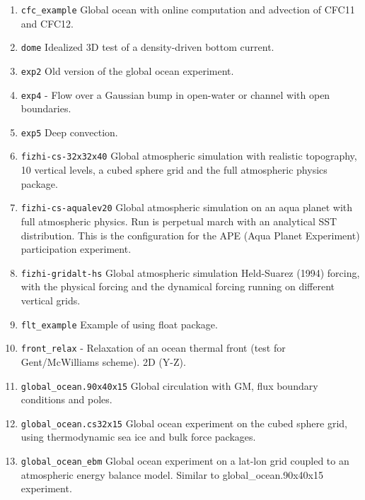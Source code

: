 \begin{enumerate}
\item \texttt{cfc\_example} Global ocean with online computation and
  advection of CFC11 and CFC12.

\item \texttt{dome} Idealized 3D test of a density-driven bottom current.

\item \texttt{exp2} Old version of the global ocean experiment.

\item \texttt{exp4} - Flow over a Gaussian bump in open-water or
  channel with open boundaries.
  
\item \texttt{exp5} Deep convection.

\item \texttt{fizhi-cs-32x32x40} Global atmospheric simulation with
  realistic topography, 10 vertical levels, a cubed sphere grid and
  the full atmospheric physics package.

\item \texttt{fizhi-cs-aqualev20} Global atmospheric simulation on an
  aqua planet with full atmospheric physics. Run is perpetual march
  with an analytical SST distribution.  This is the configuration for
  the APE (Aqua Planet Experiment) participation experiment.

\item \texttt{fizhi-gridalt-hs} Global atmospheric simulation
  Held-Suarez (1994) forcing, with the physical forcing and the
  dynamical forcing running on different vertical grids.

\item \texttt{flt\_example} Example of using float package.
  
\item \texttt{front\_relax} - Relaxation of an ocean thermal front
  (test for Gent/McWilliams scheme). 2D (Y-Z).

\item \texttt{global\_ocean.90x40x15} Global circulation with GM, flux
  boundary conditions and poles.

\item \texttt{global\_ocean.cs32x15} Global ocean experiment on the
  cubed sphere grid, using thermodynamic sea ice and bulk force
  packages.

\item \texttt{global\_ocean\_ebm} Global ocean experiment on a lat-lon
  grid coupled to an atmospheric energy balance model. Similar to
  global\_ocean.90x40x15 experiment.


\end{enumerate}
